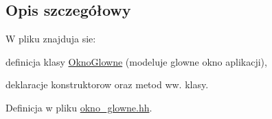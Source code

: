 \subsection{Opis szczegółowy}
W pliku znajduja sie\-:
\begin{DoxyItemize}
\item definicja klasy \hyperlink{class_okno_glowne}{Okno\-Glowne} (modeluje glowne okno aplikacji),
\item deklaracje konstruktorow oraz metod ww. klasy. 
\end{DoxyItemize}

Definicja w pliku \hyperlink{okno__glowne_8hh_source}{okno\-\_\-glowne.\-hh}.

